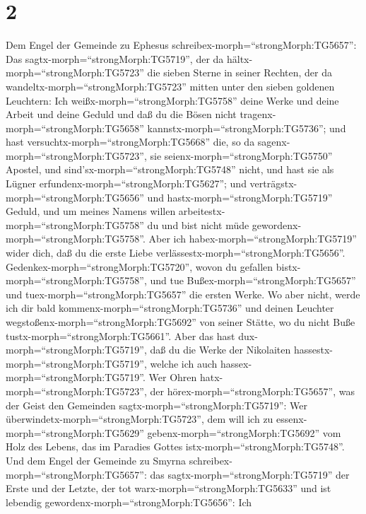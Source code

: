 \hypertarget{section-1}{%
\section{2}\label{section-1}}

 Dem Engel der Gemeinde zu Ephesus
schreibex-morph=``strongMorph:TG5657'': Das
sagtx-morph=``strongMorph:TG5719'', der da
hältx-morph=``strongMorph:TG5723'' die sieben Sterne in seiner Rechten,
der da wandeltx-morph=``strongMorph:TG5723'' mitten unter den sieben
goldenen Leuchtern:  Ich weißx-morph=``strongMorph:TG5758''
deine Werke und deine Arbeit und deine Geduld und daß du die Bösen nicht
tragenx-morph=``strongMorph:TG5658''
kannstx-morph=``strongMorph:TG5736''; und hast
versuchtx-morph=``strongMorph:TG5668'' die, so da
sagenx-morph=``strongMorph:TG5723'', sie
seienx-morph=``strongMorph:TG5750'' Apostel, und
sind'sx-morph=``strongMorph:TG5748'' nicht, und hast sie als Lügner
erfundenx-morph=``strongMorph:TG5627'';  und
verträgstx-morph=``strongMorph:TG5656'' und
hastx-morph=``strongMorph:TG5719'' Geduld, und um meines Namens willen
arbeitestx-morph=``strongMorph:TG5758'' du und bist nicht müde
gewordenx-morph=``strongMorph:TG5758''.  Aber ich
habex-morph=``strongMorph:TG5719'' wider dich, daß du die erste Liebe
verlässestx-morph=``strongMorph:TG5656''. 
Gedenkex-morph=``strongMorph:TG5720'', wovon du gefallen
bistx-morph=``strongMorph:TG5758'', und tue
Bußex-morph=``strongMorph:TG5657'' und tuex-morph=``strongMorph:TG5657''
die ersten Werke. Wo aber nicht, werde ich dir bald
kommenx-morph=``strongMorph:TG5736'' und deinen Leuchter
wegstoßenx-morph=``strongMorph:TG5692'' von seiner Stätte, wo du nicht
Buße tustx-morph=``strongMorph:TG5661''.  Aber das hast
dux-morph=``strongMorph:TG5719'', daß du die Werke der Nikolaiten
hassestx-morph=``strongMorph:TG5719'', welche ich auch
hassex-morph=``strongMorph:TG5719''.  Wer Ohren
hatx-morph=``strongMorph:TG5723'', der
hörex-morph=``strongMorph:TG5657'', was der Geist den Gemeinden
sagtx-morph=``strongMorph:TG5719'': Wer
überwindetx-morph=``strongMorph:TG5723'', dem will ich zu
essenx-morph=``strongMorph:TG5629'' gebenx-morph=``strongMorph:TG5692''
vom Holz des Lebens, das im Paradies Gottes
istx-morph=``strongMorph:TG5748''.  Und dem Engel der
Gemeinde zu Smyrna schreibex-morph=``strongMorph:TG5657'': das
sagtx-morph=``strongMorph:TG5719'' der Erste und der Letzte, der tot
warx-morph=``strongMorph:TG5633'' und ist lebendig
gewordenx-morph=``strongMorph:TG5656'':  Ich
